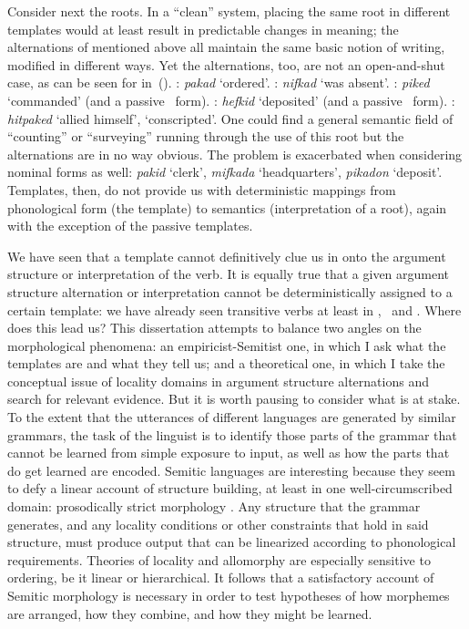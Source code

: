 Consider next the roots. In a ``clean'' system, placing the same root in different templates would at least result in predictable changes in meaning; the alternations of  mentioned above all maintain the same basic notion of writing, modified in different ways. Yet the alternations, too, are not an open-and-shut case, as can be seen for  in~(\nextx).
\pex\label{ex:naive-pkd}
  \a \tkal: \emph{pakad} `ordered'.
  \a \tnif: \emph{nifkad} `was absent'.
  \a \tpie: \emph{piked} `commanded' (and a passive \tpua~form).
  \a \thif: \emph{hefkid} `deposited' (and a passive \thuf~form).
  \a \thit: \emph{hitpaked} `allied himself', `conscripted'.
\xe
One could find a general semantic field of ``counting'' or ``surveying'' running through the use of this root but the alternations are in no way obvious. The problem is exacerbated when considering nominal forms as well: \emph{pakid} `clerk', \emph{mifkada} `headquarters', \emph{pikadon} `deposit'. Templates, then, do not provide us with deterministic mappings from phonological form (the template) to semantics (interpretation of a root), again with the exception of the passive templates.

We have seen that a template cannot definitively clue us in onto the argument structure or interpretation of the verb. It is equally true that a given argument structure alternation or interpretation cannot be deterministically assigned to a certain template: we have already seen transitive verbs at least in \tkal, \tpie~and \thif. Where does this lead us? This dissertation attempts to balance two angles on the morphological phenomena: an empiricist-Semitist one, in which I ask what the templates are and what they tell us; and a theoretical one, in which I take {the} conceptual issue {of locality domains in argument structure alternations} and search for relevant evidence. But it is worth pausing to consider what is at stake. To the extent that the utterances of different languages are generated by similar grammars, the task of the linguist is to identify those parts of the grammar that cannot be learned from simple exposure to input, as well as how the parts that do get learned are encoded. Semitic languages are interesting because they seem to defy a linear account of structure building, at least in one well-circumscribed domain: prosodically strict morphology \citep{jjmcc81}. Any structure that the grammar generates, and any locality conditions or other constraints that hold in said structure, must produce output that can be linearized according to phonological requirements. Theories of locality and allomorphy are especially sensitive to ordering, be it linear or hierarchical. It follows that a satisfactory account of Semitic morphology is necessary in order to test hypotheses of how morphemes are arranged, how they combine, and how they might be learned.

